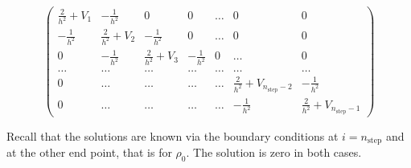 \documentclass[11pt,a4wide]{article}
\begin{document}
\begin{equation}
    \left( \begin{array}{ccccccc} \frac{2}{h^2}+V_1 & -\frac{1}{h^2} & 0   & 0    & \dots  &0     & 0 \\
                                -\frac{1}{h^2} & \frac{2}{h^2}+V_2 & -\frac{1}{h^2} & 0    & \dots  &0     &0 \\
                                0   & -\frac{1}{h^2} & \frac{2}{h^2}+V_3 & -\frac{1}{h^2}  &0       &\dots & 0\\
                                \dots  & \dots & \dots & \dots  &\dots      &\dots & \dots\\
                                0   & \dots & \dots & \dots  &\dots       &\frac{2}{h^2}+V_{n_{\mathrm{step}}-2} & -\frac{1}{h^2}\\
                                0   & \dots & \dots & \dots  &\dots       &-\frac{1}{h^2} & \frac{2}{h^2}+V_{n_{\mathrm{step}}-1}

             \end{array} \right)  
\label{eq:matrixse} 
\end{equation} 

Recall that the solutions are known via the boundary conditions at
$i=n_{\mathrm{step}}$ and at the other end point, that is for  $\rho_0$.
The solution is zero in both cases.
\end{document}
